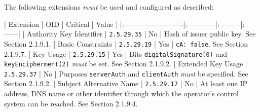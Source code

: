 The following extensions \textit{must} be used and configured as described:

| Extension                | OID         | Critical | Value |
|:-------------------------|:------------|:---------|:------|
| Authority Key Identifier | \texttt{2.5.29.35} | No       | Hash of issuer public key. See Section 2.1.9.1.
| Basic Constraints        | \texttt{2.5.29.19} | Yes      | \texttt{cA: false}. See Section 2.1.9.7.
| Key Usage                | \texttt{2.5.29.15} | Yes      | Bits \texttt{digitalSignature(0)} and \texttt{keyEncipherment(2)} \textit{must} be set. See Section 2.1.9.2.
| Extended Key Usage       | \texttt{2.5.29.37} | No       | Purposes \texttt{serverAuth} and \texttt{clientAuth} \textit{must} be specified. See Section 2.1.9.2.
| Subject Alternative Name | \texttt{2.5.29.17} | No       | At least one IP address, DNS name or other identifier through which the operator's control system can be reached. See Section 2.1.9.4.
